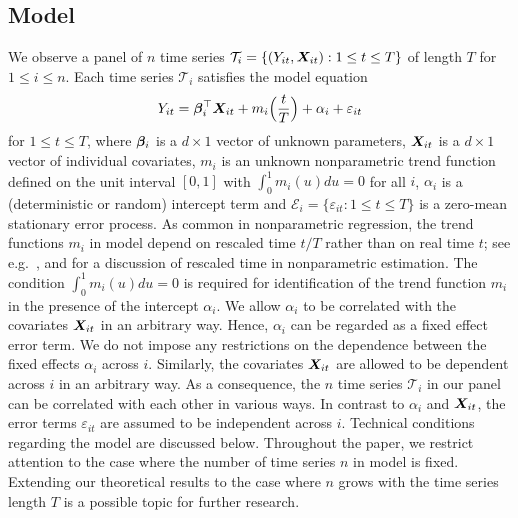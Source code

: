 \documentclass[a4paper,12pt]{article}
\makeatletter
\renewcommand{\eqref}[1]{\tagform@{\ref{#1}}}
\makeatother
\begin{document}
\subsection{Model}\label{subsec:model_setting}


We observe a panel of $n$ time series $\mathcal{T}_i = \{(Y_{it}, \boldsymbol{X}_{it}): 1 \le t \le T \}$ of length $T$ for $1 \le i \le n$. Each time series $\mathcal{T}_i$ satisfies the model equation 
\begin{equation}\label{eq:model_full}
Y_{it} = \bm{\beta}^\top_i \boldsymbol{X}_{it} + m_i \Big( \frac{t}{T} \Big) + \alpha_i + \varepsilon_{it} 
\end{equation}
for $1 \le t \le T$, where $\bm{\beta}_i$ is a $d \times 1$ vector of unknown parameters, $\boldsymbol{X}_{it}$ is a $d\times 1$ vector of individual covariates, $m_i$ is an unknown nonparametric trend function defined on the unit interval $[0,1]$ with $\int_0^1 m_i(u) du = 0$ for all $i$, $\alpha_i$ is a (deterministic or random) intercept term and $\mathcal{E}_i = \{ \varepsilon_{it}: 1 \le t \le T \}$ is a zero-mean stationary error process. As common in nonparametric regression, the trend functions $m_i$ in model \eqref{eq:model_full} depend on rescaled time $t/T$ rather than on real time $t$; see e.g.\ \cite{Robinson1989}, \cite{Dahlhaus1997} and \cite{VogtLinton2014} for a discussion of rescaled time in nonparametric estimation. The condition $\int_0^1 m_i(u) du = 0$ is required for identification of the trend function $m_i$ in the presence of the intercept $\alpha_i$. 
We allow $\alpha_i$ to be correlated with the covariates $\boldsymbol{X}_{it}$ in an arbitrary way. Hence, $\alpha_i$ can be regarded as a fixed effect error term. We do not impose any restrictions on the dependence between the fixed effects $\alpha_i$ across $i$. Similarly, the covariates $\boldsymbol{X}_{it}$ are allowed to be dependent across $i$ in an arbitrary way. As a consequence, the $n$ time series $\mathcal{T}_i$ in our panel can be correlated with each other in various ways. In contrast to $\alpha_i$ and $\boldsymbol{X}_{it}$, the error terms $\varepsilon_{it}$ are assumed to be independent across $i$. Technical conditions regarding the model are discussed below. Throughout the paper, we restrict attention to the case where the number of time series $n$ in model \eqref{eq:model_full} is fixed. Extending our theoretical results to the case where $n$ grows with the time series length $T$ is a possible topic for further research.
\end{document}
